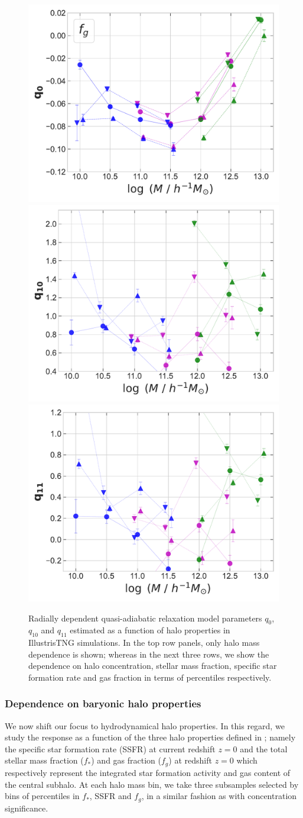 \begin{figure}
    \includegraphics[width=0.32\linewidth]{plots/fit_param_q0_M-fg_T.pdf}
    \includegraphics[width=0.32\linewidth]{plots/fit_param_q10_M-fg_T.pdf}
    \includegraphics[width=0.32\linewidth]{plots/fit_param_q11_M-fg_T.pdf}
    \caption{Radially dependent quasi-adiabatic relaxation model parameters $q_{0}$, $q_{10}$ and $q_{11}$ estimated as a function of halo properties in IllustrisTNG simulations. In the top row panels, only halo mass dependence is shown; whereas in the next three rows, we show the dependence on halo concentration, stellar mass fraction, specific star formation rate and gas fraction in terms of percentiles respectively.} %
    \label{fig:fit-fit-func-q-ch:z0main}
\end{figure}


\subsubsection{Dependence on baryonic halo properties}
We now shift our focus to hydrodynamical halo properties. In this regard, we study the response as a function of the three halo properties defined in ; namely the specific star formation rate (SSFR) at current redshift $z=0$ and the total stellar mass fraction ($f_{\ast}$) and gas fraction ($f_g$) at redshift $z=0$ which respectively represent the integrated star formation activity and gas content of the central subhalo. At each halo mass bin, we take three subsamples selected by bins of percentiles in $f_{\ast}$, SSFR and $f_g$, in a similar fashion as with concentration significance. %

